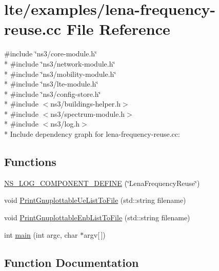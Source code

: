 \hypertarget{lena-frequency-reuse_8cc}{}\section{lte/examples/lena-\/frequency-\/reuse.cc File Reference}
\label{lena-frequency-reuse_8cc}
{\ttfamily \#include \char`\"{}ns3/core-\/module.\+h\char`\"{}}\\*
{\ttfamily \#include \char`\"{}ns3/network-\/module.\+h\char`\"{}}\\*
{\ttfamily \#include \char`\"{}ns3/mobility-\/module.\+h\char`\"{}}\\*
{\ttfamily \#include \char`\"{}ns3/lte-\/module.\+h\char`\"{}}\\*
{\ttfamily \#include \char`\"{}ns3/config-\/store.\+h\char`\"{}}\\*
{\ttfamily \#include $<$ns3/buildings-\/helper.\+h$>$}\\*
{\ttfamily \#include $<$ns3/spectrum-\/module.\+h$>$}\\*
{\ttfamily \#include $<$ns3/log.\+h$>$}\\*
Include dependency graph for lena-\/frequency-\/reuse.cc\+:
\subsection*{Functions}
\begin{DoxyCompactItemize}
\item 
\hyperlink{lena-frequency-reuse_8cc_adab596ccde2673537a20e5b2e1f7826d}{N\+S\+\_\+\+L\+O\+G\+\_\+\+C\+O\+M\+P\+O\+N\+E\+N\+T\+\_\+\+D\+E\+F\+I\+NE} (\char`\"{}Lena\+Frequency\+Reuse\char`\"{})
\item 
void \hyperlink{lena-frequency-reuse_8cc_ad818a3dd4c090b8ecaba926e5272c409}{Print\+Gnuplottable\+Ue\+List\+To\+File} (std\+::string filename)
\item 
void \hyperlink{lena-frequency-reuse_8cc_a7e3aa5272ba032faa7717e0f3ba2f73d}{Print\+Gnuplottable\+Enb\+List\+To\+File} (std\+::string filename)
\item 
int \hyperlink{lena-frequency-reuse_8cc_a0ddf1224851353fc92bfbff6f499fa97}{main} (int argc, char $\ast$argv\mbox{[}$\,$\mbox{]})
\end{DoxyCompactItemize}


\subsection{Function Documentation}
